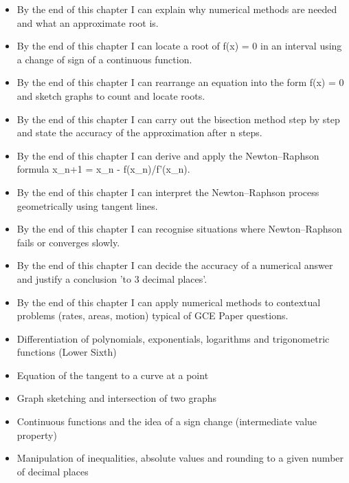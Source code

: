 \documentclass[11pt]{article}
\begin{document}
\begin{objectifs}
\begin{itemize}
\item By the end of this chapter I can explain why numerical methods are needed and what an approximate root is.
\item By the end of this chapter I can locate a root of f(x) = 0 in an interval using a change of sign of a continuous function.
\item By the end of this chapter I can rearrange an equation into the form f(x) = 0 and sketch graphs to count and locate roots.
\item By the end of this chapter I can carry out the bisection method step by step and state the accuracy of the approximation after n steps.
\item By the end of this chapter I can derive and apply the Newton–Raphson formula x\_{n+1} = x\_n - f(x\_n)/f'(x\_n).
\item By the end of this chapter I can interpret the Newton–Raphson process geometrically using tangent lines.
\item By the end of this chapter I can recognise situations where Newton–Raphson fails or converges slowly.
\item By the end of this chapter I can decide the accuracy of a numerical answer and justify a conclusion 'to 3 decimal places'.
\item By the end of this chapter I can apply numerical methods to contextual problems (rates, areas, motion) typical of GCE Paper questions.
\end{itemize}
\end{objectifs}

\begin{prerequis}
\begin{itemize}
\item Differentiation of polynomials, exponentials, logarithms and trigonometric functions (Lower Sixth)
\item Equation of the tangent to a curve at a point
\item Graph sketching and intersection of two graphs
\item Continuous functions and the idea of a sign change (intermediate value property)
\item Manipulation of inequalities, absolute values and rounding to a given number of decimal places
\end{itemize}
\end{prerequis}
\end{document}

